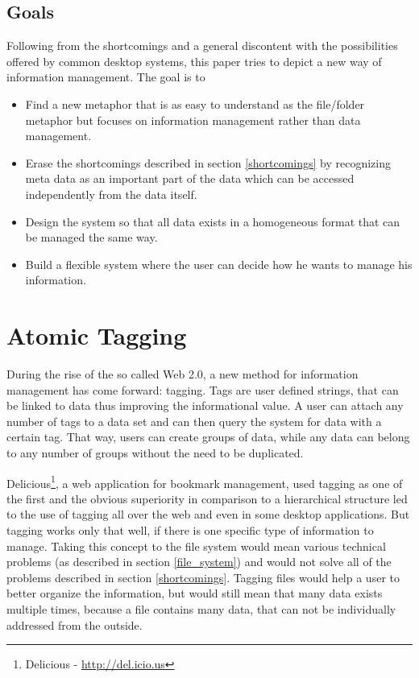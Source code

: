 \documentclass[12pt,a4paper,notitlepage,twocolumn,oneside]{article}
\begin{document}
\subsection{Goals}\label{goals}
Following from the shortcomings and a general discontent with the possibilities offered by common desktop systems, this paper tries to depict a new way of information management. The goal is to

\begin{itemize}
\item Find a new metaphor that is as easy to understand as the file/folder metaphor but focuses on information management rather than data management.
\item Erase the shortcomings described in section \ref{shortcomings} by recognizing meta data as an important part of the data which can be accessed independently from the data itself.
\item Design the system so that all data exists in a homogeneous format that can be managed the same way.
\item Build a flexible system where the user can decide how he wants to manage his information.
\end{itemize}



\section{Atomic Tagging}\label{atomic_tagging}
During the rise of the so called Web 2.0, a new method for information management has come forward: tagging. Tags are user defined strings, that can be linked to data thus improving the informational value. A user can attach any number of tags to a data set and can then query the system for data with a certain tag. That way, users can create groups of data, while any data can belong to any number of groups without the need to be duplicated.

Delicious\footnote{Delicious - \url{http://del.icio.us}}, a web application for bookmark management, used tagging as one of the first and the obvious superiority in comparison to a hierarchical structure led to the use of tagging all over the web and even in some desktop applications. But tagging works only that well, if there is one specific type of information to manage. Taking this concept to the file system would mean various technical problems (as described in section \ref{file_system}) and would not solve all of the problems described in section \ref{shortcomings}. Tagging files would help a user to better organize the information, but would still mean that many data exists multiple times, because a file contains many data, that can not be individually addressed from the outside.
\end{document}
